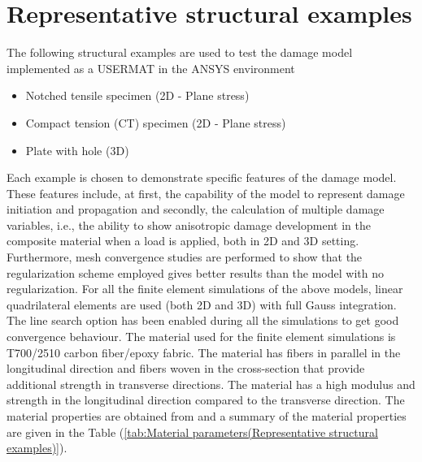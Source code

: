 \documentclass[12pt,a4paper,twoside,openright]{report}
\begin{document}
\section{Representative structural examples}
\indent\indent\indent The following structural examples are used to test the damage model implemented as a USERMAT in the ANSYS environment
\begin{itemize}
\item Notched tensile specimen (2D - Plane stress)
\item Compact tension (CT) specimen (2D - Plane stress)
\item Plate with hole (3D)
\end{itemize}
Each example is chosen to demonstrate specific features of the damage model. These features include, at first, the capability of the model to represent damage initiation and propagation and secondly, the calculation of multiple damage variables, i.e., the ability to show anisotropic damage development in the composite material when a load is applied, both in 2D and 3D setting. Furthermore, mesh convergence studies are performed to show that the regularization scheme employed gives better results than the model with no regularization. For all the finite element simulations of the above models, linear quadrilateral elements are used (both 2D and 3D) with full Gauss integration. The line search option has been enabled during all the simulations to get good convergence behaviour. The material used for the finite element simulations is T700/2510 carbon fiber/epoxy fabric. The material has fibers in parallel in the longitudinal direction and fibers woven in the cross-section that provide additional strength in transverse directions. The material has a high modulus and strength in the longitudinal direction compared to the transverse direction. The material properties are obtained from \citep{jiang2018evaluations} and a summary of the material properties are given in the Table (\ref{tab:Material parameters(Representative structural examples)}). \\
\end{document}
